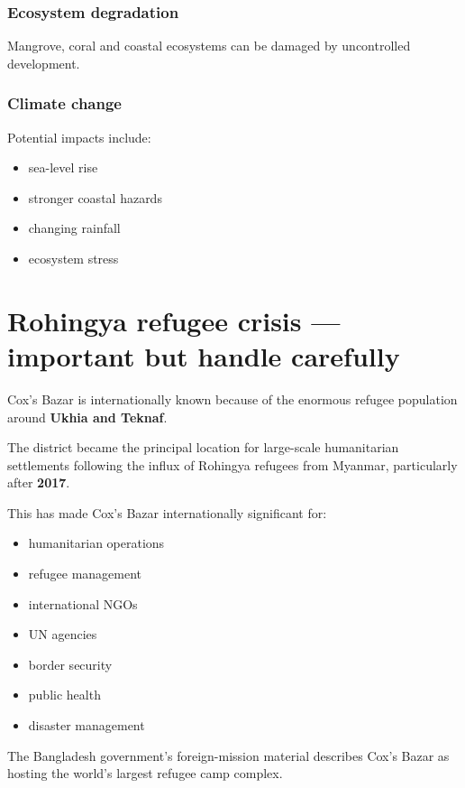 \subsubsection{Ecosystem degradation}

Mangrove, coral and coastal ecosystems can be damaged by uncontrolled development.

\subsubsection{Climate change}

Potential impacts include:

\begin{itemize}
  \item sea-level rise
  \item stronger coastal hazards
  \item changing rainfall
  \item ecosystem stress
\end{itemize}

\medskip

\section{Rohingya refugee crisis --- important but handle carefully}

Cox's Bazar is internationally known because of the enormous refugee population around \textbf{Ukhia and Teknaf}.

The district became the principal location for large-scale humanitarian settlements following the influx of Rohingya refugees from Myanmar, particularly after \textbf{2017}.

This has made Cox's Bazar internationally significant for:

\begin{itemize}
  \item humanitarian operations
  \item refugee management
  \item international NGOs
  \item UN agencies
  \item border security
  \item public health
  \item disaster management
\end{itemize}

The Bangladesh government's foreign-mission material describes Cox's Bazar as hosting the world's largest refugee camp complex.

